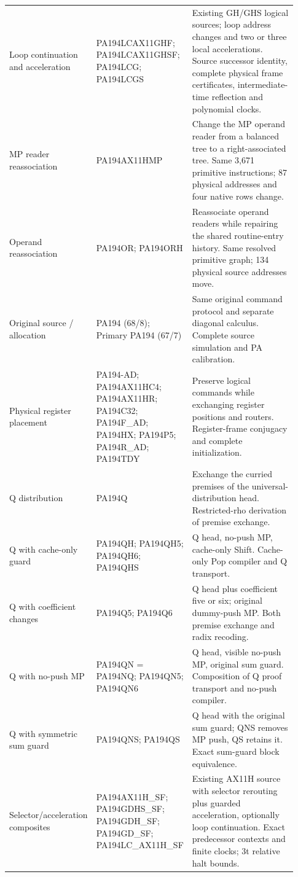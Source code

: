 \begin{longtable}{p{0.20\linewidth}p{0.30\linewidth}p{0.43\linewidth}}
Loop continuation and acceleration & PA194LCAX11GHF; PA194LCAX11GHSF; PA194LCG; PA194LCGS & Existing GH/GHS logical sources; loop address changes and two or three local accelerations. Source successor identity, complete physical frame certificates, intermediate-time reflection and polynomial clocks.\\[4pt]
MP reader reassociation & PA194AX11HMP & Change the MP operand reader from a balanced tree to a right-associated tree. Same 3,671 primitive instructions; 87 physical addresses and four native rows change.\\[4pt]
Operand reassociation & PA194OR; PA194ORH & Reassociate operand readers while repairing the shared routine-entry history. Same resolved primitive graph; 134 physical source addresses move.\\[4pt]
Original source / allocation & PA194 (68/8); Primary PA194 (67/7) & Same original command protocol and separate diagonal calculus. Complete source simulation and PA calibration.\\[4pt]
Physical register placement & PA194-AD; PA194AX11HC4; PA194AX11HR; PA194C32; PA194F\_AD; PA194HX; PA194P5; PA194R\_AD; PA194TDY & Preserve logical commands while exchanging register positions and routers. Register-frame conjugacy and complete initialization.\\[4pt]
Q distribution & PA194Q & Exchange the curried premises of the universal-distribution head. Restricted-rho derivation of premise exchange.\\[4pt]
Q with cache-only guard & PA194QH; PA194QH5; PA194QH6; PA194QHS & Q head, no-push MP, cache-only Shift. Cache-only Pop compiler and Q transport.\\[4pt]
Q with coefficient changes & PA194Q5; PA194Q6 & Q head plus coefficient five or six; original dummy-push MP. Both premise exchange and radix recoding.\\[4pt]
Q with no-push MP & PA194QN = PA194NQ; PA194QN5; PA194QN6 & Q head, visible no-push MP, original sum guard. Composition of Q proof transport and no-push compiler.\\[4pt]
Q with symmetric sum guard & PA194QNS; PA194QS & Q head with the original sum guard; QNS removes MP push, QS retains it. Exact sum-guard block equivalence.\\[4pt]
Selector/acceleration composites & PA194AX11H\_SF; PA194GDHS\_SF; PA194GDH\_SF; PA194GD\_SF; PA194LC\_AX11H\_SF & Existing AX11H source with selector rerouting plus guarded acceleration, optionally loop continuation. Exact predecessor contexts and finite clocks; 3t relative halt bounds.\\[4pt]

\end{longtable}
